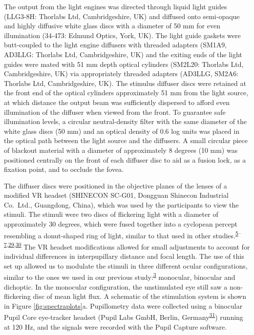 \documentclass[
]{article}
\begin{document}
The output from the light engines was directed through liquid light guides (LLG3-8H: Thorlabs Ltd, Cambridgeshire, UK) and diffused onto semi-opaque and highly diffusive white glass discs with a diameter of 50 mm for even illumination (34-473: Edmund Optics, York, UK). The light guide gaskets were butt-coupled to the light engine diffusers with threaded adapters (SM1A9, AD3LLG: Thorlabs Ltd, Cambridgeshire, UK) and the exiting ends of the light guides were mated with 51 mm depth optical cylinders (SM2L20: Thorlabs Ltd, Cambridgeshire, UK) via appropriately threaded adapters (AD3LLG, SM2A6: Thorlabs Ltd, Cambridgeshire, UK). The stimulus diffuser discs were retained at the front end of the optical cylinders approximately 51 mm from the light source, at which distance the output beam was sufficiently dispersed to afford even illumination of the diffuser when viewed from the front. To guarantee safe illumination levels, a circular neutral-density filter with the same diameter of the white glass discs (50 mm) and an optical density of 0.6 log units was placed in the optical path between the light source and the diffusers. A small circular piece of blackout material with a diameter of approximately 8 degrees (10 mm) was positioned centrally on the front of each diffuser disc to aid as a fusion lock, as a fixation point, and to occlude the fovea.

The diffuser discs were positioned in the objective planes of the lenses of a modified VR headset (SHINECON SC-G01, Dongguan Shinecon Industrial Co.~Ltd., Guangdong, China), which was used by the participants to view the stimuli. The stimuli were two discs of flickering light with a diameter of approximately 30 degrees, which were fused together into a cyclopean percept resembling a donut-shaped ring of light, similar to that used in other studies.\textsuperscript{\protect\hyperlink{ref-Barrionuevo2016}{5}--\protect\hyperlink{ref-Spitschan2014}{7},\protect\hyperlink{ref-Spitschan2015}{29},\protect\hyperlink{ref-Zele2018}{30}} The VR headset modifications allowed for small adjustments to account for individual differences in interpupillary distance and focal length. The use of this set up allowed us to modulate the stimuli in three different ocular configurations, similar to the ones we used in our previous study:\textsuperscript{\protect\hyperlink{ref-Segala2023}{3}} monocular, binocular and dichoptic. In the monocular configuration, the unstimulated eye still saw a non-flickering disc of mean light flux. A schematic of the stimulation system is shown in Figure \ref{fig:spectraplots}a. Pupillometry data were collected using a binocular Pupil Core eye-tracker headset (Pupil Labs GmbH, Berlin, Germany\textsuperscript{\protect\hyperlink{ref-Kassner2014}{31}}) running at 120 Hz, and the signals were recorded with the Pupil Capture software.
\end{document}
